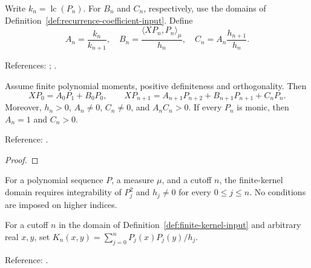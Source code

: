 \begin{definition}
\label{def:general-recurrence-coefficients}
\leanok
Write $k_n=\operatorname{lc}(P_n)$. For $B_n$ and $C_n$, respectively, use the domains of Definition~\ref{def:recurrence-coefficient-input}. Define
\[
 A_n=\frac{k_n}{k_{n+1}},\quad
 B_n=\frac{\langle XP_n,P_n\rangle_\mu}{h_n},\quad
 C_n=A_n\frac{h_{n+1}}{h_n}.
\]

References: \cite[18.2(iv)]{dlmf}; \cite[Chapter 3]{szego}.
\end{definition}

\begin{theorem}
\label{thm:general-coefficient-signs}
\leanok
Assume finite polynomial moments, positive definiteness and orthogonality. Then
\[
 XP_0=A_0P_1+B_0P_0,\qquad
 XP_{n+1}=A_{n+1}P_{n+2}+B_{n+1}P_{n+1}+C_nP_n.
\]
Moreover, $h_n>0$, $A_n\ne0$, $C_n\ne0$, and $A_nC_n>0$.
If every $P_n$ is monic, then $A_n=1$ and $C_n>0$.

Reference: \cite[18.2(iv)]{dlmf}.
\end{theorem}
\begin{proof}
\leanok
\end{proof}

\begin{definition}
\label{def:finite-kernel-input}
\leanok
For a polynomial sequence $P$, a measure $\mu$, and a cutoff $n$, the finite-kernel domain requires integrability of $P_j^2$ and $h_j\ne0$ for every $0\le j\le n$.
No conditions are imposed on higher indices.
\end{definition}

\begin{definition}
\label{def:general-kernel}
\leanok
For a cutoff $n$ in the domain of Definition~\ref{def:finite-kernel-input} and arbitrary real $x,y$, set $K_n(x,y)=\sum_{j=0}^n P_j(x)P_j(y)/h_j$.

Reference: \cite[18.2.12]{dlmf}.
\end{definition}

